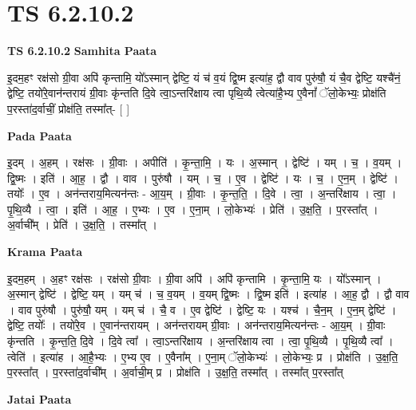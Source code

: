 \documentclass[17pt]{extarticle}
\begin{document}
\section{ TS 6.2.10.2 }

\textbf{TS 6.2.10.2 } \newline
\textbf{Samhita Paata} \newline

इ॒दम॒हꣳ रक्ष॑सो ग्री॒वा अपि॑ कृन्तामि॒ यो᳚ऽस्मान् द्वेष्टि॒ यं च॑ व॒यं द्वि॒ष्म इत्या॑ह॒ द्वौ वाव पुरु॑षौ॒ यं चै॒व द्वेष्टि॒ यश्चै॑नं॒ द्वेष्टि॒ तयो॑रे॒वान॑न्तरायं ग्री॒वाः कृ॑न्तति दि॒वे त्वा॒ऽन्तरि॑क्षाय त्वा पृथि॒व्यै त्वेत्या॑है॒भ्य ए॒वैनां᳚ ॅलो॒केभ्यः॒ प्रोक्ष॑ति प॒रस्ता॑द॒र्वाचीं॒ प्रोक्ष॑ति॒ तस्मा᳚त्- [  ] \newline

\textbf{Pada Paata} \newline

इ॒दम् । अ॒हम् । रक्ष॑सः । ग्री॒वाः । अपीति॑ । कृ॒न्ता॒मि॒ । यः । अ॒स्मान् । द्वेष्टि॑ । यम् । च॒ । व॒यम् । द्वि॒ष्मः । इति॑ । आ॒ह॒ । द्वौ । वाव । पुरु॑षौ । यम् । च॒ । ए॒व । द्वेष्टि॑ । यः । च॒ । ए॒न॒म् । द्वेष्टि॑ । तयोः᳚ । ए॒व । अन॑न्तराय॒मित्यन॑न्तः - आ॒य॒म् । ग्री॒वाः । कृ॒न्त॒ति॒ । दि॒वे । त्वा॒ । अ॒न्तरि॑क्षाय । त्वा॒ । पृ॒थि॒व्यै । त्वा॒ । इति॑ । आ॒ह॒ । ए॒भ्यः । ए॒व । ए॒ना॒म् । लो॒केभ्यः॑ । प्रेति॑ । उ॒क्ष॒ति॒ । प॒रस्ता᳚त् । अ॒र्वाची᳚म् । प्रेति॑ । उ॒क्ष॒ति॒ । तस्मा᳚त् ।  \newline


\textbf{Krama Paata} \newline

इ॒दम॒हम् । अ॒हꣳ रक्ष॑सः । रक्ष॑सो ग्री॒वाः । ग्री॒वा अपि॑ । अपि॑ कृन्तामि । कृ॒न्ता॒मि॒ यः । यो᳚ऽस्मान् । अ॒स्मान् द्वेष्टि॑ । द्वेष्टि॒ यम् । यम् च॑ । च॒ व॒यम् । व॒यम् द्वि॒ष्मः । द्वि॒ष्म इति॑ । इत्या॑ह । आ॒ह॒ द्वौ । द्वौ वाव । वाव पुरु॑षौ । पुरु॑षौ॒ यम् । यम् च॑ । चै॒ व । ए॒व द्वेष्टि॑ । द्वेष्टि॒ यः । यश्च॑ । चै॒न॒म् । ए॒न॒म् द्वेष्टि॑ । द्वेष्टि॒ तयोः᳚ । तयो॑रे॒व । ए॒वान॑न्तरायम् । अन॑न्तरायम् ग्री॒वाः । अन॑न्तराय॒मित्यन॑न्तः - आ॒य॒म् । ग्री॒वाः कृ॑न्तति । कृ॒न्त॒ति॒ दि॒वे । दि॒वे त्वा᳚ । त्वा॒ऽन्तरि॑क्षाय । अ॒न्तरि॑क्षाय त्वा । त्वा॒ पृ॒थि॒व्यै । पृ॒थि॒व्यै त्वा᳚ । त्वेति॑ । इत्या॑ह । आ॒है॒भ्यः । ए॒भ्य ए॒व । ए॒वैना᳚म् । ए॒ना॒म् ॅलो॒केभ्यः॑ । लो॒केभ्यः॒ प्र । प्रोक्ष॑ति । उ॒क्ष॒ति॒ प॒रस्ता᳚त् । प॒रस्ता॑द॒र्वाची᳚म् । अ॒र्वाची॒म् प्र । प्रोक्ष॑ति । उ॒क्ष॒ति॒ तस्मा᳚त् । तस्मा᳚त् प॒रस्ता᳚त् \newline

\textbf{Jatai Paata} \newline
\end{document}
